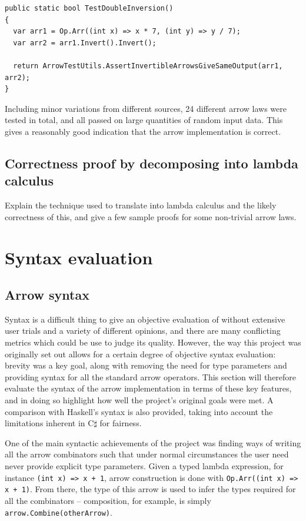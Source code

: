 \documentclass[12pt,twoside,notitlepage]{report}
\begin{document}
\begin{lstlisting}
public static bool TestDoubleInversion()
{
  var arr1 = Op.Arr((int x) => x * 7, (int y) => y / 7);
  var arr2 = arr1.Invert().Invert();

  return ArrowTestUtils.AssertInvertibleArrowsGiveSameOutput(arr1, arr2);
}
\end{lstlisting}

Including minor variations from different sources, 24 different arrow laws were tested in total, and all passed on large quantities of random input data. This gives a reasonably good indication that the arrow implementation is correct.

\subsection{Correctness proof by decomposing into lambda calculus}

Explain the technique used to translate into lambda calculus and the likely correctness of this, and give a few sample proofs for some non-trivial arrow laws.

\section{Syntax evaluation}

\subsection{Arrow syntax}

Syntax is a difficult thing to give an objective evaluation of without extensive user trials and a variety of different opinions, and there are many conflicting metrics which could be use to judge its quality. However, the way this project was originally set out allows for a certain degree of objective syntax evaluation: brevity was a key goal, along with removing the need for type parameters and providing syntax for all the standard arrow operators. This section will therefore evaluate the syntax of the arrow implementation in terms of these key features, and in doing so highlight how well the project's original goals were met. A comparison with Haskell's syntax is also provided, taking into account the limitations inherent in C$\sharp$ for fairness.

One of the main syntactic achievements of the project was finding ways of writing all the arrow combinators such that under normal circumstances the user need never provide explicit type parameters. Given a typed lambda expression, for instance \texttt{(int x) => x + 1}, arrow construction is done with \texttt{Op.Arr((int x) => x + 1)}. From there, the type of this arrow is used to infer the types required for all the combinators -- composition, for example, is simply \texttt{arrow.Combine(otherArrow)}.
\end{document}
